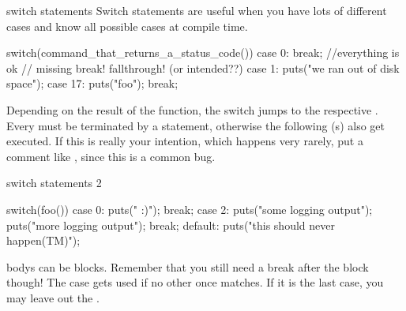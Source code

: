 \documentclass[10pt,graphics,aspectratio=169,table]{beamer}
\begin{document}
\begin{frame}[fragile]{switch statements}
    Switch statements are useful when you have lots of different 
    cases and know all possible cases at compile time. 
    \begin{codeblock}
switch(command_that_returns_a_status_code()){
    case 0: break; //everything is ok
    // missing break! fallthrough! (or intended??)
    case 1: puts("we ran out of disk space"); 
    case 17: puts("foo"); break;
}
    \end{codeblock}

    Depending on the result of the function, the switch jumps to the respective
    . Every  must be terminated by a 
     statement, otherwise the following (s) also get
    executed. If this is really your intention, which happens very rarely,
    put a comment like , since this is a common bug.
\end{frame}

\begin{frame}[fragile]{switch statements 2}
\begin{codeblock}
    switch(foo()){
        case 0: puts(" :)"); break;
        case 2: {
            puts("some logging output");
            puts("more logging output");
        }break;
        default: puts("this should never happen(TM)"); 
    }
\end{codeblock}
     bodys can be blocks. Remember that you still need a break 
    after the block though! The  case gets used if no other once
    matches. If it is the last case, you may leave out the .
\end{frame}
\end{document}
